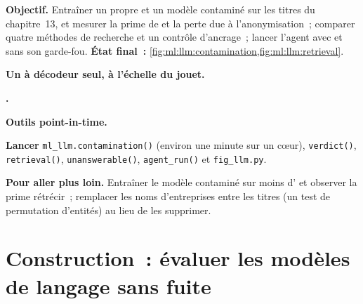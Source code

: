 \begin{tutorial}
\textbf{Objectif.} Entraîner un  propre et un modèle contaminé sur les titres du chapitre~13, et mesurer la prime de
 et la perte due à l'anonymisation~; comparer quatre méthodes de recherche et un contrôle d'ancrage~; lancer l'agent avec et sans son
garde-fou. \textbf{État final~:} \cref{fig:ml:llm:contamination,fig:ml:llm:retrieval}.
\begin{tutsteps}
\item \textbf{Un  à décodeur seul, à l'échelle du jouet.}
\label{lst:ml:llm:tinylm}
\item \textbf{.}
\label{lst:ml:llm:bm25}
\item \textbf{Outils point-in-time.}
\label{lst:ml:llm:tools}
\item \textbf{Lancer} \texttt{ml\_llm.contamination()} (environ une minute sur un cœur), \texttt{verdict()}, \texttt{retrieval()},
\texttt{unanswerable()}, \texttt{agent\_run()} et \texttt{fig\_llm.py}.
\end{tutsteps}
\textbf{Pour aller plus loin.} Entraîner le modèle contaminé sur moins d' et observer la prime rétrécir~; remplacer les noms d'entreprises
entre les titres (un test de permutation d'entités) au lieu de les supprimer.
\end{tutorial}

\section{Construction~: évaluer les modèles de langage sans fuite}\label{bld:ml:large-language-models-in-finance:llmeval}

